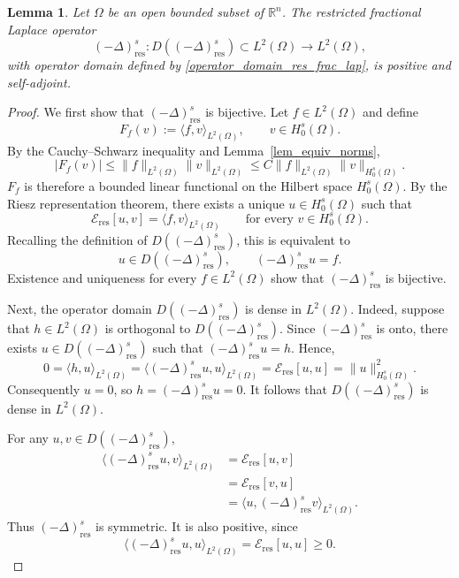 \documentclass[preprint,12pt]{elsarticle}
\newtheorem{lemma}[theorem]{Lemma}
\begin{document}
\begin{lemma}\label{lemma_self_adj_res_frac_Lapl}
Let $\Omega$ be an open bounded subset of $\mathbb{R}^n$. The restricted
fractional Laplace operator
\[
    (-\Delta)^s_{\mathrm{res}}
    :
    D((-\Delta)^s_{\mathrm{res}})\subset L^2(\Omega)
    \longrightarrow L^2(\Omega),
\]
with operator domain defined by
\eqref{operator_domain_res_frac_lap}, is positive and self-adjoint.
\end{lemma}
\begin{proof} We first show that $(-\Delta)^s_{\mathrm{res}}$ is bijective. Let
$f\in L^2(\Omega)$ and define
\[
    F_f(v):=\langle f,v\rangle_{L^2(\Omega)},
    \qquad v\in H^s_0(\Omega).
\]
By the Cauchy--Schwarz inequality and
Lemma~\ref{lem_equiv_norms},
\[
    |F_f(v)|
    \leq
    \|f\|_{L^2(\Omega)}
    \|v\|_{L^2(\Omega)}
    \leq
    C\|f\|_{L^2(\Omega)}
    \|v\|_{H^s_0(\Omega)}.
\]
$F_f$ is therefore a bounded linear functional on the Hilbert space
$H^s_0(\Omega)$. By the Riesz representation theorem, there exists a
unique $u\in H^s_0(\Omega)$ such that
\[
    \mathcal E_{\mathrm{res}}[u,v]
    =
    \langle f,v\rangle_{L^2(\Omega)}
    \qquad
    \text{for every }v\in H^s_0(\Omega).
\]
Recalling the definition of $D((-\Delta)^s_{\mathrm{res}})$, this is equivalent to
\[
    u\in D((-\Delta)^s_{\mathrm{res}}),
    \qquad
    (-\Delta)^s_{\mathrm{res}}u=f.
\]
Existence and uniqueness for every $f\in L^2(\Omega)$ show
that $(-\Delta)^s_{\mathrm{res}}$ is bijective.

Next, the operator domain $D((-\Delta)^s_{\mathrm{res}})$ is dense in $L^2(\Omega)$. Indeed,
suppose that $h\in L^2(\Omega)$ is orthogonal to $D((-\Delta)^s_{\mathrm{res}})$.
Since $(-\Delta)^s_{\mathrm{res}}$ is onto, there exists
$u\in D((-\Delta)^s_{\mathrm{res}})$ such that
$(-\Delta)^s_{\mathrm{res}}u=h$. Hence,
\[
    0
    =
    \langle h,u\rangle_{L^2(\Omega)}
    =
    \langle (-\Delta)^s_{\mathrm{res}}u,u\rangle_{L^2(\Omega)}
    =
    \mathcal E_{\mathrm{res}}[u,u]
    =
    \|u\|_{H^s_0(\Omega)}^2.
\]
Consequently $u=0$, so
$h=(-\Delta)^s_{\mathrm{res}}u=0$. It follows that
$D((-\Delta)^s_{\mathrm{res}})$ is dense in $L^2(\Omega)$.

For any $u,v\in D((-\Delta)^s_{\mathrm{res}})$,
\begin{align*}
    \langle (-\Delta)^s_{\mathrm{res}}u,v\rangle_{L^2(\Omega)}
    &=
    \mathcal E_{\mathrm{res}}[u,v] \\
    &=
    \mathcal E_{\mathrm{res}}[v,u] \\
    &=
    \langle u,(-\Delta)^s_{\mathrm{res}}v\rangle_{L^2(\Omega)}.
\end{align*}
Thus $(-\Delta)^s_{\mathrm{res}}$ is symmetric. It is also positive,
since
\[
    \langle (-\Delta)^s_{\mathrm{res}}u,u\rangle_{L^2(\Omega)}
    =
    \mathcal E_{\mathrm{res}}[u,u]
    \geq 0.
\]


\end{proof}
\end{document}
